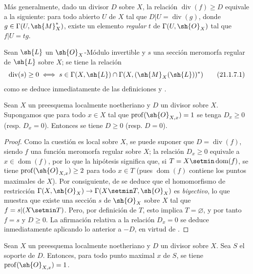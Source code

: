 Más generalmente, dado un divisor $D$ sobre $X$, la relación $\operatorname{div}(f)\geq D$ equivale a la siguiente: para todo abierto $U$ de $X$ tal que $D|U=\operatorname{div}(g)$, donde $g\in\Gamma(U,\sh{M}_X^*)$, existe un elemento \emph{regular} $t$ de $\Gamma(U,\sh{O}_X)$ tal que $f|U=tg$.

\begin{env}[21.1.7]
\label{IV.21.1.7}
Sean $\sh{L}$ un $\sh{O}_X$-Módulo invertible y $s$ una sección meromorfa regular de $\sh{L}$ sobre $X$; se tiene la relación
\[
\label{IV.21.1.7.1}
  \operatorname{div}(s)\geq0 \iff s\in\Gamma(X,\sh{L})\cap\Gamma(X,(\sh{M}_X(\sh{L}))^*)
  \tag{21.1.7.1}
\]
como se deduce inmediatamente de las definiciones  y .
\end{env}

\begin{proposition}[21.1.8]
\label{IV.21.1.8}
Sean $X$ un preesquema localmente noetheriano y $D$ un divisor sobre $X$.
Supongamos que para todo $x\in X$ tal que $\operatorname{prof}(\sh{O}_{X,x})=1$ se tenga $D_x\geq0$ \textup{(resp. $D_x=0$)}.
Entonces se tiene $D\geq0$ \textup{(resp. $D=0$)}.
\end{proposition}

\begin{proof}
Como la cuestión es local sobre $X$, se puede suponer que $D=\operatorname{div}(f)$, siendo $f$ una
función meromorfa regular sobre $X$;
la relación $D_x\geq0$ equivale a $x\in\operatorname{dom}(f)$, por lo que la hipótesis significa que, si $T=X\setmin\operatorname{dom}(f)$, se tiene $\operatorname{prof}(\sh{O}_{X,x})\geq2$ para todo $x\in T$ (pues $\operatorname{dom}(f)$ contiene los puntos maximales de $X$).
Por consiguiente, de  se deduce que el homomorfismo de restricción $\Gamma(X,\sh{O}_X)\to\Gamma(X\setmin T,\sh{O}_X)$ es \emph{biyectivo}, lo que muestra que existe una sección $s$ de $\sh{O}_X$ sobre $X$ tal que $f=s|(X\setmin T)$.
Pero, por definición de $T$, esto implica $T=\varnothing$, y por tanto $f=s$ y $D\geq0$.
La afirmación relativa a la relación $D_x=0$ se deduce inmediatamente aplicando lo anterior a $-D$, en virtud de .
\end{proof}


\begin{corollary}[21.1.9]
\label{IV.21.1.9}
Sean $X$ un preesquema localmente noetheriano y $D$ un divisor sobre $X$.
Sea $S$ el soporte de $D$.
Entonces, para todo punto maximal $x$ de $S$, se tiene $\operatorname{prof}(\sh{O}_{X,x})=1$.
\end{corollary}

